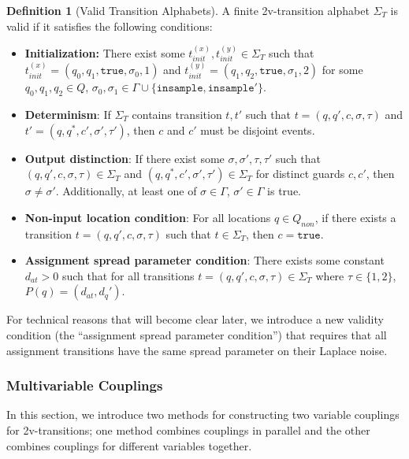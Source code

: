 \documentclass[12pt]{article}
\theoremstyle{definition}
\newtheorem{defn}[thm]{Definition}
\begin{document}
\begin{defn}[Valid Transition Alphabets]
    A finite 2v-transition alphabet $\Sigma_T$ is valid if it satisfies the following conditions: 
    \begin{itemize}
        \item \textbf{Initialization:} There exist some $t_{init}^{(x)}, t_{init}^{(y)}\in \Sigma_T$ such that $t_{init}^{(x)} = (q_0, q_1, \texttt{true}, \sigma_0, 1)$ and $t_{init}^{(y)} = (q_1, q_2, \texttt{true}, \sigma_1, 2)$ for some $q_0, q_1, q_2\in Q$, $\sigma_0, \sigma_1 \in \Gamma\cup\{\texttt{insample}, \texttt{insample}'\}$. 
        \item \textbf{Determinism}: If $\Sigma_T$ contains transition $t, t'$ such that $t=(q, q', c, \sigma, \tau)$ and $t'= (q, q^*, c', \sigma', \tau')$, then $c$ and $c'$ must be disjoint events. 
        \item \textbf{Output distinction}: If there exist some $\sigma, \sigma', \tau, \tau'$ such that $(q, q', c, \sigma, \tau)\in \Sigma_T$  and $(q, q^*, c', \sigma', \tau') \in \Sigma_T$ for distinct guards $c, c'$, then $\sigma \neq \sigma'$. Additionally, at least one of $\sigma\in \Gamma$, $\sigma'\in \Gamma$ is true.
        \item \textbf{Non-input location condition}: For all locations $q\in Q_{non}$, if there exists a transition $t=(q, q', c, \sigma, \tau)$ such that $t\in \Sigma_T$, then $c = \texttt{true}$.
        \item \textbf{Assignment spread parameter condition}: There exists some constant $d_{at}>0$ such that for all transitions $t = (q, q', c, \sigma, \tau)\in \Sigma_T$ where $\tau \in \{1, 2\}$, $P(q) = (d_{at}, d_q')$.
    \end{itemize}
\end{defn}

For technical reasons that will become clear later, we introduce a new validity condition (the ``assignment spread parameter condition'') that requires that all assignment transitions have the same spread parameter on their Laplace noise.

\subsubsection{Multivariable Couplings}

In this section, we introduce two methods for constructing two variable couplings for 2v-transitions; one method combines couplings in parallel and the other combines couplings for different variables together. 
\end{document}
